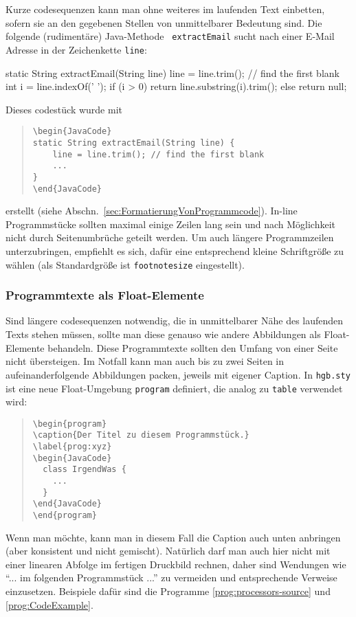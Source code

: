 Kurze codesequenzen kann man ohne weiteres im laufenden Text
einbetten, sofern sie an den gegebenen Stellen von unmittelbarer
Bedeutung sind. Die folgende (rudimentäre) Java-Methode {\tt
extractEmail} sucht nach einer E-Mail Adresse in der Zeichenkette
\texttt{line}:

\medskip
\begin{JavaCode}
static String extractEmail(String line) {
    line = line.trim(); // find the first blank
    int i = line.indexOf(' '); 
    if (i > 0)
        return line.substring(i).trim();
    else
        return null;
}
\end{JavaCode}
\medskip

\noindent
Dieses codestück wurde mit 
\begin{quote}
\begin{verbatim}
\begin{JavaCode}
static String extractEmail(String line) {
    line = line.trim(); // find the first blank
    ...
}
\end{JavaCode}
\end{verbatim}
\end{quote}
erstellt (siehe Abschn.\ \ref{sec:FormatierungVonProgrammcode}). In-line Programmstücke sollten maximal einige Zeilen lang sein und nach Möglichkeit nicht durch Seitenumbrüche geteilt werden.
Um auch längere Programmzeilen unterzubringen, empfiehlt es sich, dafür
eine entsprechend kleine Schriftgröße zu wählen (als Standardgröße ist
\texttt{footnotesize} eingestellt). 



\subsubsection{Programmtexte als Float-Elemente}
Sind längere codesequenzen notwendig, die in unmittelbarer Nähe des laufenden Texts
stehen müssen, sollte man diese genauso wie andere Abbildungen als Float-Elemente
behandeln. Diese Programmtexte sollten den Umfang von einer Seite nicht übersteigen.
Im Notfall kann man auch bis zu zwei Seiten in aufeinanderfolgende Abbildungen packen,
jeweils mit eigener Caption. In \texttt{hgb.sty} ist eine neue Float-Umgebung \texttt{program} definiert, die analog zu \texttt{table} verwendet wird:
%
\begin{quote}
\begin{verbatim}
\begin{program}
\caption{Der Titel zu diesem Programmstück.}
\label{prog:xyz}
\begin{JavaCode}
  class IrgendWas {
    ...
  }
\end{JavaCode}
\end{program}
\end{verbatim}
\end{quote}
%
Wenn man möchte, kann man in diesem Fall die Caption auch unten anbringen (aber konsistent und nicht gemischt).
Natürlich darf man auch hier  nicht mit einer linearen  Abfolge im fertigen
Druckbild rechnen, daher sind Wendungen wie
"`... im  folgenden Programmstück ..."' zu vermeiden und entsprechende Verweise
einzusetzen. Beispiele dafür sind die Programme \ref{prog:processors-source} und \ref{prog:CodeExample}.


